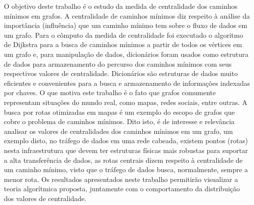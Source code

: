 \begin{resumo}
	O objetivo deste trabalho é o estudo da medida de centralidade dos caminhos mínimos em grafos. A centralidade de caminhos mínimos diz respeito à análise da importância (influência) que um caminho mínimo tem sobre o fluxo de dados em um grafo. Para o cômputo da medida de centralidade foi executado o algoritmo de Dijkstra para a busca de caminhos mínimos a partir de todos os vértices em um grafo e, para manipulação de dados, dicionários foram usados como estrutura de dados para armazenamento do percurso dos caminhos mínimos com seus respectivos valores de centralidade. Dicionários são estruturas de dados muito eficientes e convenientes para a busca e armazenamento de informações indexadas por chaves. O que motiva este trabalho é o fato que grafos comumente representam situações do mundo real, como mapas, redes sociais, entre outras. A busca por rotas otimizadas em mapas é um exemplo do escopo de grafos que cobre o problema de caminhos mínimos. Dito isto, é de interesse e relevância analisar os valores de centralidades dos caminhos mínimos em um grafo, um exemplo disto, no tráfego de dados em uma rede cabeada, existem pontos (rotas) nesta infraestrutura que devem ter estruturas físicas mais robustas para suportar a alta transferência de dados, as rotas centrais dizem respeito à centralidade de um caminho mínimo, visto que o tráfego de dados busca, normalmente, sempre a menor rota. Os resultados apresentados neste trabalho permitirão visualizar a teoria algorítmica proposta, juntamente com o comportamento da distribuição dos valores de centralidade. \newline \newline
\end{resumo}
